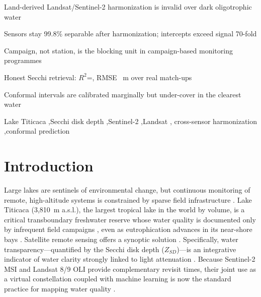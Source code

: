 \documentclass[preprint,review,12pt,authoryear]{elsarticle}
\begin{document}
\begin{frontmatter}
\begin{highlights}
\item Land-derived Landsat/Sentinel-2 harmonization is invalid over dark
oligotrophic water
\item Sensors stay 99.8\% separable after harmonization; intercepts exceed
signal 70-fold
\item Campaign, not station, is the blocking unit in campaign-based
monitoring programmes
\item Honest Secchi retrieval: $R^2$=\numHeadlineRTwo, RMSE
\numHeadlineRmse~m over \numHeadlineN{} real match-ups
\item Conformal intervals are calibrated marginally but under-cover in the
clearest water
\end{highlights}

\begin{keyword}
Lake Titicaca \sep Secchi disk depth \sep Sentinel-2 \sep Landsat \sep
cross-sensor harmonization \sep conformal prediction
\end{keyword}

\end{frontmatter}

\section{Introduction}\label{sec:intro}

Large lakes are sentinels of environmental change, but continuous monitoring of remote, high-altitude systems is constrained by sparse field infrastructure \citep{Williamson2009}. Lake Titicaca (3,810~m a.s.l.), the largest tropical lake in the world by volume, is a critical transboundary freshwater reserve whose water quality is documented only by infrequent field campaigns \citep{OEFA2016,Siguayro2022eval}, even as eutrophication advances in its near-shore bays \citep{Heredia2022,Lanza2024}. Satellite remote sensing offers a synoptic solution \citep{Gholizadeh2016,Topp2020}. Specifically, water transparency---quantified by the Secchi disk depth ($Z_{SD}$)---is an integrative indicator of water clarity strongly linked to light attenuation \citep{Lee2015}. Because Sentinel-2 MSI and Landsat 8/9 OLI provide complementary revisit times, their joint use as a virtual constellation coupled with machine learning is now the standard practice for mapping water quality \citep{Pahlevan2020, Cao2022}.
\end{document}
